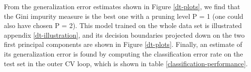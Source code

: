 From the generalization error estimates shown in Figure \ref{dt-plots}, we find that the Gini impurity measure is the best one with a pruning level P = 1 (one could also have chosen P = 2). This model trained on the whole data set is illustrated appendix \ref{dt-illustration}, and its decision boundaries projected down on the two first principal components are shown in Figure \ref{dt-plots}. Finally, an estimate of its generalization error is found by computing the classification error rate on the test set in the outer CV loop, which is shown in table \ref{classification-performance}.



 
 

